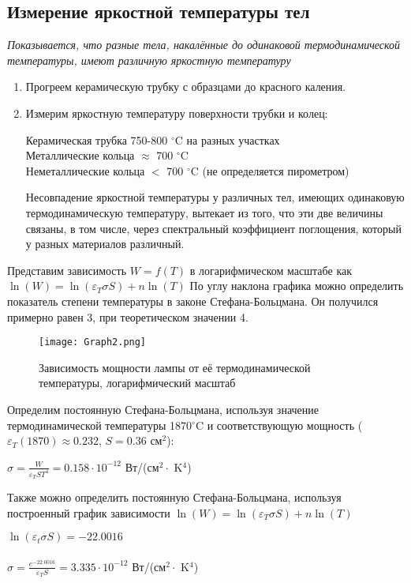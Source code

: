 \subsection{Измерение яркостной температуры тел}
\textit{Показывается, что разные тела, накалённые до одинаковой термодинамической температуры, имеют различную яркостную температуру}
\begin{enumerate}
    \item Прогреем керамическую трубку с образцами до красного каления.
    \item Измерим яркостную температуру поверхности трубки и колец:
          \begin{center}
              Керамическая трубка \hspace{1cm} 750-800 $^{\circ}$C на разных участках \\
              Металлические кольца \hspace{1cm} $\approx$ 700 $^{\circ}$C \\
              Неметаллические кольца \hspace{1cm} $<$ 700 $^{\circ}$C (не определяется пирометром)
          \end{center}
          Несовпадение яркостной температуры у различных тел, имеющих одинаковую термодинамическую температуру, вытекает из того, что эти две величины связаны, в том числе, через спектральный коэффициент поглощения, который у разных материалов различный.
\end{enumerate}

\item Представим зависимость $W=f(T)$ в логарифмическом масштабе как $\ln(W) = \ln(\varepsilon_T \sigma S) + n \ln(T)$ По углу наклона графика можно определить показатель степени температуры в законе Стефана-Больцмана. Он получился примерно равен 3, при теоретическом значении 4.

\begin{figure}[h]
    \centering
    \texttt{[image: Graph2.png]}
    \caption{Зависимость мощности лампы от её термодинамической температуры, логарифмический масштаб}
    \label{fig:vac}
\end{figure}

\item Определим постоянную Стефана-Больцмана, используя значение термодинамической температуры 1870$^{\circ}$C и соответствующую мощность ($\varepsilon_T(1870) \approx 0.232$, $S = 0.36$ см$^2$):
\begin{center}
    $\sigma = \frac{W}{\varepsilon_T S T^4} = 0.158 \cdot 10^{-12}$ Вт/(см$^2 \cdot$ K$^4$)
\end{center}
Также можно определить постоянную Стефана-Больцмана, используя построенный график зависимости $\ln(W) = \ln(\varepsilon_T \sigma S) + n \ln(T)$
\begin{center}
    $\ln(\varepsilon_t \sigma S) = -22.0016$ \\
    \\
    $\sigma = \frac{e^{-22.0016}}{\varepsilon_T S} = 3.335 \cdot 10^{-12}$ Вт/(см$^2 \cdot$ K$^4$)
\end{center}

